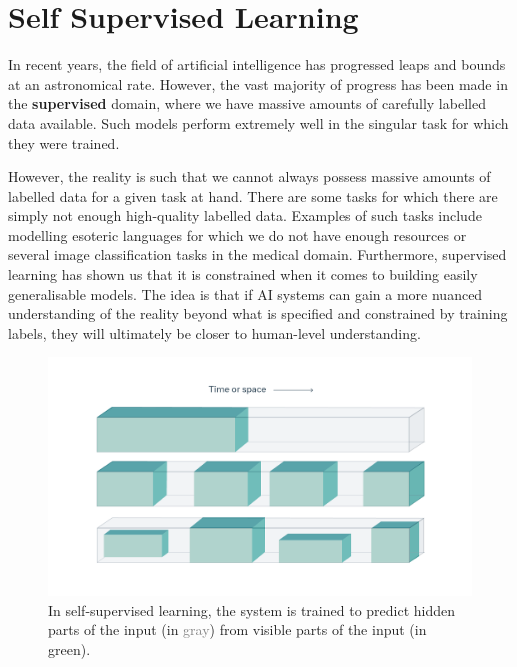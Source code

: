 \chapter{Self Supervised Learning} \label{chap:self-supervised-learning}

In recent years, the field of artificial intelligence has progressed leaps and bounds at an astronomical rate. 
However, the vast majority of progress has been made in the \textbf{supervised} domain, where we have massive amounts of carefully labelled data available. Such models perform extremely well in the singular task for which they were trained.

However, the reality is such that we cannot always possess massive amounts of labelled data for a given task at hand.
There are some tasks for which there are simply not enough high-quality labelled data. Examples of such tasks include modelling esoteric languages for which we do not have enough resources or several image classification tasks in the medical domain.
Furthermore, supervised learning has shown us that it is constrained when it comes to building easily generalisable models.
The idea is that if AI systems can gain a more nuanced understanding of the reality beyond what is specified and constrained by training labels, they will ultimately be closer to human-level understanding.
\begin{figure}[th]
    \centering
    \includegraphics[width=\linewidth]{chapters/assets/ssl_figs/ssl.png}
    \caption{In self-supervised learning, the system is trained to predict hidden parts of the input (in \textcolor{gray}{gray}) from visible parts of the input (in \textcolor{tudelft-turquoise}{green}).}
    \label{fig:ssl-idea}
\end{figure}

